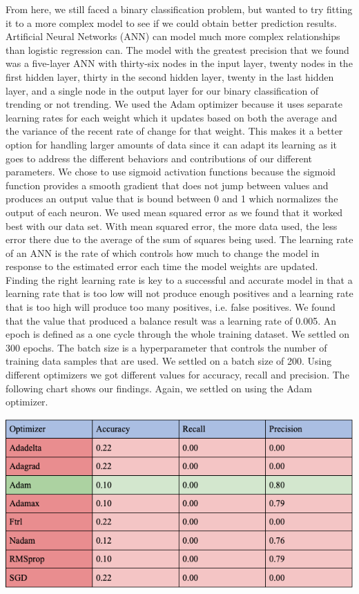 \documentclass{article}
\begin{document}
\quad From here, we still faced a binary classification problem, but wanted to try fitting it to a more complex model to see if we could obtain better prediction results.  Artificial Neural Networks (ANN) can model much more complex relationships than logistic regression can.  The model with the greatest precision that we found was a five-layer ANN with thirty-six nodes in the input layer, twenty nodes in the first hidden layer, thirty in the second hidden layer, twenty in the last hidden layer, and a single node in the output layer for our binary classification of trending or not trending.  We used the Adam optimizer because it uses separate learning rates for each weight which it updates based on both the average and the variance of the recent rate of change for that weight.  This makes it a better option for handling larger amounts of data since it can adapt its learning as it goes to address the different behaviors and contributions of our different parameters.  We chose to use sigmoid activation functions because the sigmoid function provides a smooth gradient that does not jump between values and produces an output value that is bound between 0 and 1 which normalizes the output of each neuron. We used mean squared error as we found that it worked best with our data set. With mean squared error, the more data used, the less error there due to the average of the sum of squares being used. The learning rate of an ANN is the rate of which controls how much to change the model in response to the estimated error each time the model weights are updated. Finding the right learning rate is key to a successful and accurate model in that a learning rate that is too low will not produce enough positives and a learning rate that is too high will produce too many positives, i.e. false positives. We found that the value that produced a balance result was a learning rate of 0.005. An epoch is defined as a one cycle through the whole training dataset. We settled on 300 epochs. The batch size is a hyperparameter that controls the number of training data samples that are used. We settled on a batch size of 200.  Using different optimizers we got different values for accuracy, recall and precision. The following chart shows our findings. Again, we settled on using the Adam optimizer. 

\includegraphics[scale=.4]{chart2.png}\\
\end{document}
